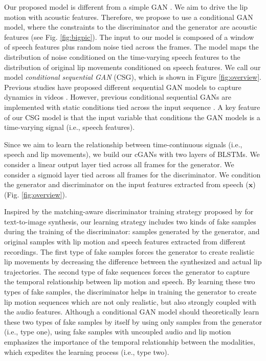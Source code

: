 \documentclass[10pt,journal,compsoc]{IEEEtran}
\begin{document}
Our proposed model is different from a simple GAN \cite{Goodfellow_2014}. We aim to drive the lip motion with acoustic features. Therefore, we propose to use a conditional GAN model, where the constraints to the discriminator and the generator are acoustic features (see Fig. \ref{fig:bigpic}). The input to our model is composed of a window of speech features plus random noise tied across the frames. The model maps the distribution of noise conditioned on the time-varying speech features to the distribution of original lip movements conditioned  on speech features. We call our model \emph{conditional sequential GAN} (CSG), which is shown in Figure \ref{fig:overview}. Previous studies have proposed different sequential GAN models to capture dynamics in videos \cite{Vondrick_2016,Tulyakov_2017}. However, previous conditional sequential GANs are implemented with static conditions tied across the input sequence \cite{Tulyakov_2017}. A key feature of our CSG model is that the input variable that conditions the GAN models is a time-varying signal (i.e., speech features). 


Since we aim to learn the relationship between time-continuous signals (i.e., speech and lip movements), we build our cGANs with two layers of BLSTMs. We consider a linear output layer tied across all frames for the generator. We consider a sigmoid layer tied across all frames for the discriminator. We condition the generator and discriminator on the input features extracted from speech ($\mathbf{x}$) (Fig. \ref{fig:overview}).

Inspired by the matching-aware discriminator training strategy proposed by  \citet{Reed2016_2} for text-to-image synthesis, our learning strategy includes two kinds of fake samples during the training of the discriminator: samples generated by the generator, and original samples with lip motion and speech features extracted from different recordings. 
The first type of fake samples forces the generator to create realistic lip movements by decreasing the difference between the synthesized and actual lip trajectories. The second type of fake sequences forces the generator to capture the temporal relationship between lip motion and speech. By learning these two types of fake samples, the discriminator helps in training the generator to create lip motion sequences which are not only realistic, but also strongly coupled with the audio features. Although a conditional GAN model should theoretically learn these two types of fake samples by itself by using only samples from the generator (i.e., type one), using fake samples with uncoupled audio and lip motion emphasizes the importance of the temporal relationship between the modalities, which expedites the learning process (i.e., type two). 
\end{document}
